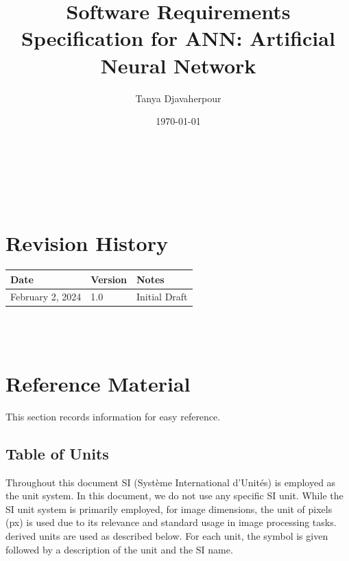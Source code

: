 \documentclass[12pt]{article}
\begin{document}
\title{Software Requirements Specification for ANN: Artificial Neural Network} 
\author{Tanya Djavaherpour}
\date{\today}
	
\maketitle

~\newpage


\tableofcontents

~\newpage

\section*{Revision History}

\begin{tabularx}{\textwidth}{p{3cm}p{2cm}X}
\toprule {\bf Date} & {\bf Version} & {\bf Notes}\\
\midrule
February 2, 2024 & 1.0 & Initial Draft\\
\bottomrule
\end{tabularx}

~\\

~\newpage

\section{Reference Material}

This section records information for easy reference.

\subsection{Table of Units}

Throughout this document SI (Syst\`{e}me International d'Unit\'{e}s) is employed
as the unit system. 
In this document, we do not use any specific SI unit.
While the SI unit system is primarily employed, for image dimensions, the unit 
of pixels (px) is used due to its relevance and standard usage in image processing tasks.
derived units are used as described below. For each unit, the symbol is given followed by a
description of the unit and the SI name.
\end{document}

